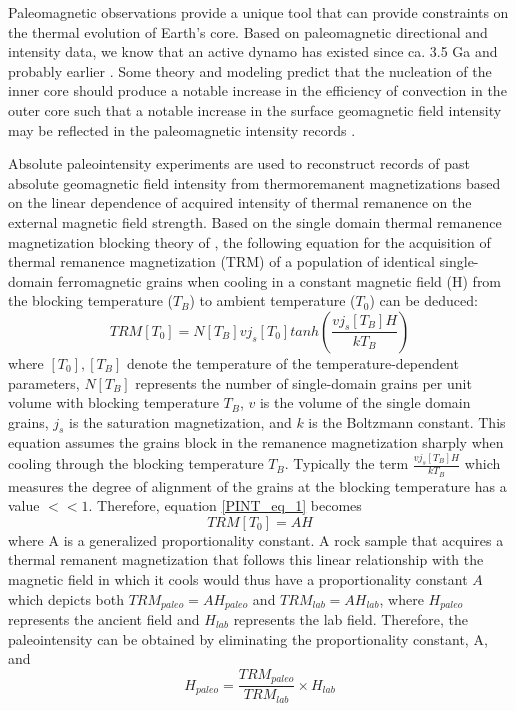  Paleomagnetic observations provide a unique tool that can provide constraints on the thermal evolution of Earth’s core. Based on paleomagnetic directional and intensity data, we know that an active dynamo has existed since ca. 3.5 Ga \citep{Selkin2007a, Biggin2011a, Tarduno2014a, Brenner2020a, Brenner2022a} and probably earlier \citep{Tarduno2015a}. Some theory and modeling predict that the nucleation of the inner core should produce a notable increase in the efficiency of convection in the outer core such that a notable increase in the surface geomagnetic field intensity may be reflected in the paleomagnetic intensity records \cite[e.g.][]{Labrosse2003a, Aubert2009a, Driscoll2016a, Landeau2022a}. 

Absolute paleointensity experiments are used to reconstruct records of past absolute geomagnetic field intensity from thermoremanent magnetizations based on the linear dependence of acquired intensity of thermal remanence on the external magnetic field strength. Based on the single domain thermal remanence magnetization blocking theory of \cite{Neel1955a}, the following equation for the acquisition of thermal remanence magnetization (TRM) of a population of identical single-domain ferromagnetic grains when cooling in a constant magnetic field (H) from the blocking temperature ($T_B$) to ambient temperature ($T_0$) can be deduced:
\begin{equation*}
    TRM [T_0] = N[T_B] v j_s [T_0] tanh(\frac{v j_s [T_B]H}{k T_B})
\label{PINT_eq_1}
\end{equation*}
where $[T_0], [T_B]$ denote the temperature of the temperature-dependent parameters, $N[T_B]$ represents the number of single-domain grains per unit volume with blocking temperature $T_B$, $v$ is the volume of the single domain grains, $j_s$ is the saturation magnetization, and $k$ is the Boltzmann constant. This equation assumes the grains block in the remanence magnetization sharply when cooling through the blocking temperature $T_B$. Typically the term $\frac{v j_s [T_B]H}{k T_B}$ which measures the degree of alignment of the grains at the blocking temperature has a value $<<1$. Therefore, equation \ref{PINT_eq_1} becomes 
\begin{equation*}
    TRM [T_0] = AH
\label{PINT_eq_2}
\end{equation*}
where A is a generalized proportionality constant. A rock sample that acquires a thermal remanent magnetization that follows this linear relationship with the magnetic field in which it cools would thus have a proportionality constant $A$ which depicts both $TRM_{paleo}=AH_{paleo}$ and $TRM_{lab}=AH_{lab}$, where $H_{paleo}$ represents the ancient field and $H_{lab}$ represents the lab field. Therefore, the paleointensity can be obtained by eliminating the proportionality constant, A, and 
\begin{equation*}
    H_{paleo} = \frac{TRM_{paleo}}{TRM_{lab}} \times H_{lab}
\label{PINT_eq_3}
\end{equation*}

